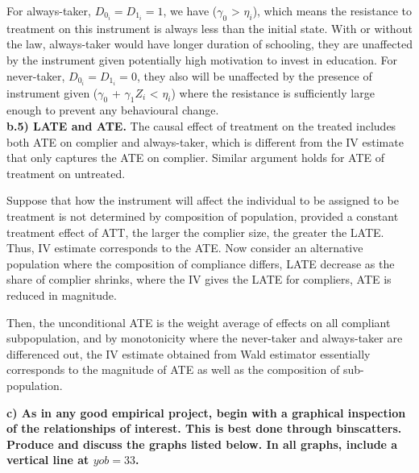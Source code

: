 \documentclass[a4paper,12pt,oneside,English]{article}
\begin{document}
For always-taker, $D_0_i=D_1_i=1$, we have ($\gamma_0$ > $\eta_i$), which means the resistance to treatment on this instrument is always less than the initial state. With or without the law, always-taker would have longer duration of schooling, they are unaffected by the instrument given potentially high motivation to invest in education. For never-taker, $D_0_i=D_1_i=0$, they also will be unaffected by the presence of instrument given ($\gamma_0$ + $\gamma_1$$Z_i$ < $\eta_i$) where the resistance is sufficiently large enough to prevent any behavioural change.  \\

\textbf{b.5) LATE and ATE.} 
The causal effect of treatment on the treated includes both ATE on complier and always-taker, which is different from the IV estimate that only captures the ATE on complier. Similar argument holds for ATE of treatment on untreated.

Suppose that how the instrument will affect the individual to be assigned to be treatment is not determined by composition of population, provided a constant treatment effect of ATT, the larger the complier size, the greater the LATE. Thus, IV estimate corresponds to the ATE. Now consider an alternative population where the composition of compliance differs, LATE decrease as the share of complier shrinks, where the IV gives the LATE for compliers, ATE is reduced in magnitude.

Then, the unconditional ATE is the weight average of effects on all compliant subpopulation, and by monotonicity where the never-taker and always-taker are differenced out, the IV estimate obtained from Wald estimator essentially corresponds to the magnitude of ATE as well as the composition of sub-population.

\newpage

\textbf{c) As in any good empirical project, begin with a graphical inspection of the relationships of interest. This is best done through binscatters. Produce and discuss the graphs listed below. In all graphs, include a vertical line at $yob=33$.}\\
\end{document}
